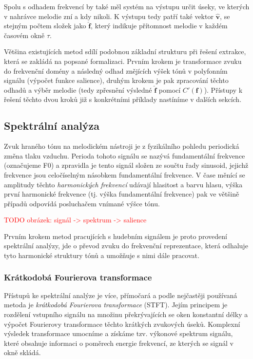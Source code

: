 Spolu s odhadem frekvencí by také měl systém na výstupu určit úseky, ve kterých v nahrávce melodie zní a kdy nikoli. K výstupu tedy patří také vektor $\hat{\mathbf{v}}$, se stejným počtem složek jako $\hat{\mathbf{f}}$, který indikuje přítomnost melodie v každém časovém okně $\tau$.

Většina existujících metod sdílí podobnou základní strukturu při řešení extrakce, která se zakládá na popsané formalizaci. Prvním krokem je transformace zvuku do frekvenční domény a následný odhad znějících výšek tónů v polyfonním signálu (výpočet funkce salience), druhým krokem je pak zpracování těchto odhadů a výběr melodie (tedy zpřesnění výsledné $\hat{\mathbf{f}}$ pomocí $C'(\mathbf{f})$). Přístupy k řešení těchto dvou kroků již s konkrétními příklady nastíníme v dalších sekcích.


\subsection{Spektrální analýza}

Zvuk hraného tónu na melodickém nástroji je z fyzikálního pohledu periodická změna tlaku vzduchu. Perioda tohoto signálu se nazývá fundamentální frekvence (označujeme F0) a zpravidla je tento signál složen ze součtu řady sinusoid, jejichž frekvence jsou celočíselným násobkem fundamentální frekvence. V čase měnící se amplitudy těchto \emph{harmonických frekvencí} udávají hlasitost a barvu hlasu, výška první harmonické frekvence (tj. výška fundamentální frekvence) pak ve většině případů odpovídá posluchačem vnímané výšce tónu. 

\textcolor{red}{TODO obrázek: signál -> spektrum -> salience}

Prvním krokem metod pracujících s hudebním signálem je proto provedení spektrální analýzy, jde o převod zvuku do frekvenční reprezentace, která odhaluje tyto harmonické struktury tónů a umožňuje s nimi dále pracovat. 

\subsubsection{Krátkodobá Fourierova transformace}

Přístupů ke spektrální analýze je více, přímočará a podle \cite{Dressler2016} nejčastěji používaná metoda je \emph{krátkodobá Fourierova transformace} (STFT). Jejím principem je rozdělení vstupního signálu na množinu překrývajících se oken konstantní délky a výpočet Fourierovy transformace těchto krátkých zvukových úseků. Komplexní výsledek transformace umocníme a získáme tzv. výkonové spektrum signálu, které obsahuje informaci o poměrech energie frekvencí, ze kterých se signál v okně skládá. 

